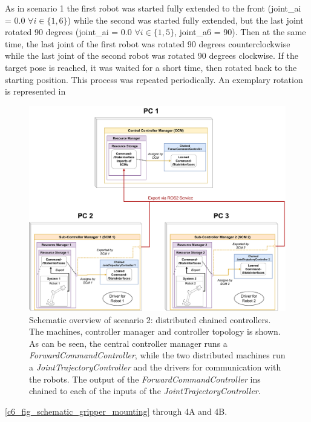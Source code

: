 As in scenario 1 the first robot was started fully extended to the front (joint\_ai = 0.0 $\forall i\in\{1,6\}$) while the second was started fully extended, but the last joint rotated 90 degrees (joint\_ai = 0.0 $\forall i\in\{1,5\}$, joint\_a6 = 90). Then at the same time, the last joint of the first robot was rotated 90 degrees counterclockwise while the last joint of the second robot was rotated 90 degrees clockwise. If the target pose is reached, it was waited for a short time, then rotated back to the starting position. This process was repeated periodically. An exemplary rotation is represented in 
\begin{figure}[H]
	\centering
	\includegraphics[width=1\textwidth]{Figures/c6/test_scenario_2.pdf}
	\caption{Schematic overview of scenario 2: distributed chained controllers. The machines, controller manager and controller topology is shown. As can be seen, the central controller manager runs a \textit{ForwardCommandController}, while the two distributed machines run a \textit{JointTrajectoryController} and the drivers for communication with the robots. The output of the \textit{ForwardCommandController} ins chained to each of the inputs of the \textit{JointTrajectoryController}.}
	\label{c6_fig_test_scenario_2}
\end{figure}
\autoref{c6_fig_schematic_gripper_mounting} through 4A and 4B.\newline
